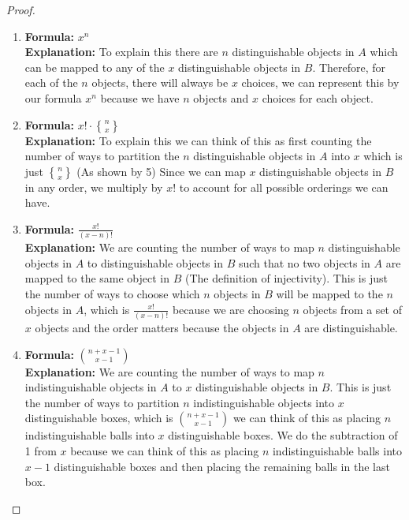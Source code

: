 \documentclass[answers]{exam}
\newcommand{\stirling}[2]{\genfrac{\{}{\}}{0pt}{}{#1}{#2}}
\begin{document}
			\begin{solution}
			\begin{proof} 
            
            \begin{enumerate}
                \item 
                    \textbf{Formula:} $x^n$ \\
                    \textbf{Explanation:} 
					To explain this there are $n$ distinguishable objects in $A$ which can be mapped to any of the $x$ distinguishable objects in $B$. Therefore, for each of the $n$ objects, there will always be $x$ choices, we can represent this by our formula $x^n$ because we have $n$ objects and $x$ choices for each object.
                
                \item 
                    \textbf{Formula:} $x! \cdot \stirling{n}{x}$ \\
                    \textbf{Explanation:} 
					To explain this we can think of this as first counting the number of ways to partition the $n$ distinguishable objects in $A$ into $x$ which is just $\stirling{n}{x}$ (As shown by 5) Since we can map $x$ distinguishable objects in $B$ in any order, we multiply by $x!$ to account for all possible orderings we can have.
                
                \item 
                    \textbf{Formula:} $\frac{x!}{(x-n)!}$ \\
                    \textbf{Explanation:} 
					We are counting the number of ways to map $n$ distinguishable objects in $A$ to distinguishable objects in $B$ such that no two objects in $A$ are mapped to the same object in $B$ (The definition of injectivity). This is just the number of ways to choose which $n$ objects in $B$ will be mapped to the $n$ objects in $A$, which is $\frac{x!}{(x-n)!}$ because we are choosing $n$ objects from a set of $x$ objects and the order matters because the objects in $A$ are distinguishable.
                \item 
                    \textbf{Formula:} $\binom{n+x-1}{x-1}$ \\
                    \textbf{Explanation:} 
					We are counting the number of ways to map $n$ indistinguishable objects in $A$ to $x$ distinguishable objects in $B$. This is just the number of ways to partition $n$ indistinguishable objects into $x$ distinguishable boxes, which is $\binom{n+x-1}{x-1}$ we can think of this as placing $n$ indistinguishable balls into $x$ distinguishable boxes. We do the subtraction of 1 from $x$ because we can think of this as placing $n$ indistinguishable balls into $x-1$ distinguishable boxes and then placing the remaining balls in the last box.
                

\end{enumerate}
\end{proof}
\end{solution}
\end{document}
